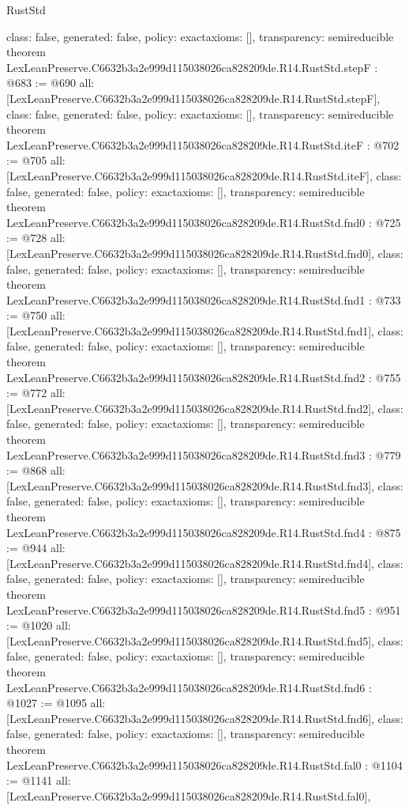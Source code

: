 \begin{lexlean}{RustStd}
\begin{coremodule}
{  class: false,
  generated: false,
  policy: exact{axioms: []},
  transparency: semireducible
}
theorem LexLeanPreserve.C6632b3a2e999d115038026ca828209de.R14.RustStd.stepF : @683 := @690 {
  all: [LexLeanPreserve.C6632b3a2e999d115038026ca828209de.R14.RustStd.stepF],
  class: false,
  generated: false,
  policy: exact{axioms: []},
  transparency: semireducible
}
theorem LexLeanPreserve.C6632b3a2e999d115038026ca828209de.R14.RustStd.iteF : @702 := @705 {
  all: [LexLeanPreserve.C6632b3a2e999d115038026ca828209de.R14.RustStd.iteF],
  class: false,
  generated: false,
  policy: exact{axioms: []},
  transparency: semireducible
}
theorem LexLeanPreserve.C6632b3a2e999d115038026ca828209de.R14.RustStd.fnd0 : @725 := @728 {
  all: [LexLeanPreserve.C6632b3a2e999d115038026ca828209de.R14.RustStd.fnd0],
  class: false,
  generated: false,
  policy: exact{axioms: []},
  transparency: semireducible
}
theorem LexLeanPreserve.C6632b3a2e999d115038026ca828209de.R14.RustStd.fnd1 : @733 := @750 {
  all: [LexLeanPreserve.C6632b3a2e999d115038026ca828209de.R14.RustStd.fnd1],
  class: false,
  generated: false,
  policy: exact{axioms: []},
  transparency: semireducible
}
theorem LexLeanPreserve.C6632b3a2e999d115038026ca828209de.R14.RustStd.fnd2 : @755 := @772 {
  all: [LexLeanPreserve.C6632b3a2e999d115038026ca828209de.R14.RustStd.fnd2],
  class: false,
  generated: false,
  policy: exact{axioms: []},
  transparency: semireducible
}
theorem LexLeanPreserve.C6632b3a2e999d115038026ca828209de.R14.RustStd.fnd3 : @779 := @868 {
  all: [LexLeanPreserve.C6632b3a2e999d115038026ca828209de.R14.RustStd.fnd3],
  class: false,
  generated: false,
  policy: exact{axioms: []},
  transparency: semireducible
}
theorem LexLeanPreserve.C6632b3a2e999d115038026ca828209de.R14.RustStd.fnd4 : @875 := @944 {
  all: [LexLeanPreserve.C6632b3a2e999d115038026ca828209de.R14.RustStd.fnd4],
  class: false,
  generated: false,
  policy: exact{axioms: []},
  transparency: semireducible
}
theorem LexLeanPreserve.C6632b3a2e999d115038026ca828209de.R14.RustStd.fnd5 : @951 := @1020 {
  all: [LexLeanPreserve.C6632b3a2e999d115038026ca828209de.R14.RustStd.fnd5],
  class: false,
  generated: false,
  policy: exact{axioms: []},
  transparency: semireducible
}
theorem LexLeanPreserve.C6632b3a2e999d115038026ca828209de.R14.RustStd.fnd6 : @1027 := @1095 {
  all: [LexLeanPreserve.C6632b3a2e999d115038026ca828209de.R14.RustStd.fnd6],
  class: false,
  generated: false,
  policy: exact{axioms: []},
  transparency: semireducible
}
theorem LexLeanPreserve.C6632b3a2e999d115038026ca828209de.R14.RustStd.fal0 : @1104 := @1141 {
  all: [LexLeanPreserve.C6632b3a2e999d115038026ca828209de.R14.RustStd.fal0],
}
\end{coremodule}
\end{lexlean}
